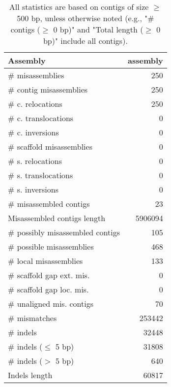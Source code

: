 \documentclass[12pt,a4paper]{article}
\begin{document}
\begin{table}[ht]
\begin{center}
\caption{All statistics are based on contigs of size $\geq$ 500 bp, unless otherwise noted (e.g., "\# contigs ($\geq$ 0 bp)" and "Total length ($\geq$ 0 bp)" include all contigs).}
\begin{tabular}{|l*{1}{|r}|}
\hline
Assembly & assembly \\ \hline
\# misassemblies & 250 \\ \hline
\hspace{2mm}\# contig misassemblies & 250 \\ \hline
\hspace{5mm}\# c. relocations & 250 \\ \hline
\hspace{5mm}\# c. translocations & 0 \\ \hline
\hspace{5mm}\# c. inversions & 0 \\ \hline
\hspace{2mm}\# scaffold misassemblies & 0 \\ \hline
\hspace{5mm}\# s. relocations & 0 \\ \hline
\hspace{5mm}\# s. translocations & 0 \\ \hline
\hspace{5mm}\# s. inversions & 0 \\ \hline
\# misassembled contigs & 23 \\ \hline
Misassembled contigs length & 5906094 \\ \hline
\# possibly misassembled contigs & 105 \\ \hline
\hspace{5mm}\# possible misassemblies & 468 \\ \hline
\# local misassemblies & 133 \\ \hline
\# scaffold gap ext. mis. & 0 \\ \hline
\# scaffold gap loc. mis. & 0 \\ \hline
\# unaligned mis. contigs & 70 \\ \hline
\# mismatches & 253442 \\ \hline
\# indels & 32448 \\ \hline
\hspace{5mm}\# indels ($\leq$ 5 bp) & 31808 \\ \hline
\hspace{5mm}\# indels ($>$ 5 bp) & 640 \\ \hline
Indels length & 60817 \\ \hline
\end{tabular}
\end{center}
\end{table}
\end{document}
